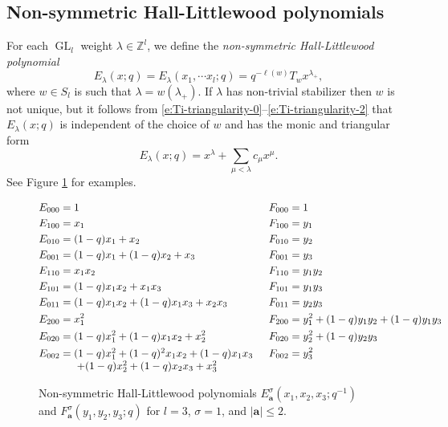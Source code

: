 \documentclass[12pt]{amsart}
\theoremstyle{definition}
\theoremstyle{remark}
\newcommand{\ZZ}{{\mathbb Z}}
\newcommand{\aA}{{\mathbf a}}
\DeclareMathOperator{\GL}{GL}
\begin{document}
\subsection{Non-symmetric Hall-Littlewood polynomials}
\label{ss:non-symm-HL}

For each $\GL _{l}$ weight $\lambda \in \ZZ ^{l}$, we define the {\em
non-symmetric Hall-Littlewood polynomial}
\begin{equation}\label{e:E-lambda}
E_{\lambda }(x;q) = E_{\lambda }(x_1,\cdots x_l;q) = q^{-\ell(w)}T_{w} x^{\lambda _{+}},
\end{equation}
where $w\in S_{l}$ is such that $\lambda =w(\lambda _{+})$.  If
$\lambda $ has non-trivial stabilizer then $w$ is not unique, but it
follows from
\eqref{e:Ti-triangularity-0}--\eqref{e:Ti-triangularity-2} that
$E_{\lambda }(x;q)$ is independent of the choice of $w$ and has the
monic and triangular form
\begin{equation}\label{e:E-monic}
E_{\lambda }(x;q) = x^{\lambda } +\sum _{\mu <\lambda } c_{\mu }
x^{\mu }.
\end{equation}
See Figure \ref{fig:ns Hall-Littlewood} for examples.

\begin{figure}
\begin{align*}
E_{000}& = 1 && F_{000}= 1 \\
E_{100}& =  x_1 && F_{100}= y_1 \\
E_{010}& = (1-q)x_1 + x_2
&& F_{010} = y_2 \\
E_{001}& = (1-q)x_1 + (1-q)x_2 + x_3 &&
F_{001}= y_3 \\
E_{110}& = x_1x_2 &&
F_{110} = y_1y_2 \\
E_{101}& = (1-q)x_1x_2 + x_1x_3 &&
F_{101} = y_1y_3 \\
E_{011}& = (1-q)x_1x_2 + (1-q)x_1x_3 + x_2x_3 &&
F_{011} = y_2y_3 \\
E_{200}& = x_1^2  &&
F_{200} = y_1^2 + (1-q)y_1y_2 + (1-q)y_1y_3\\
E_{020}& = (1-q)x_1^2 + (1-q)x_1x_2 + x_2^2 &&
F_{020} = y_2^2 + (1-q)y_2y_3 \\
E_{002}& =\!\!\! \begin{array}[t]{l}
(1-q) x_1^2 + (1-q)^{2} x_1 x_2 + (1-q)x_1 x_3\\
\; + (1-q) x_2^2 + (1-q) x_2 x_3 + x_3^2
\end{array}
&& F_{002} = y_3^2
\end{align*}
\caption{\label{fig:ns Hall-Littlewood}
Non-symmetric Hall-Littlewood polynomials
$E^{\sigma}_{\aA}(x_{1},x_{2},x_{3};q^{-1})$ and $F^{\sigma
}_{\aA}(y_{1},y_{2},y_{3};q)$ for $l = 3$, $\sigma = 1$, and $|\aA|
\le 2$.}
\end{figure}
\end{document}
